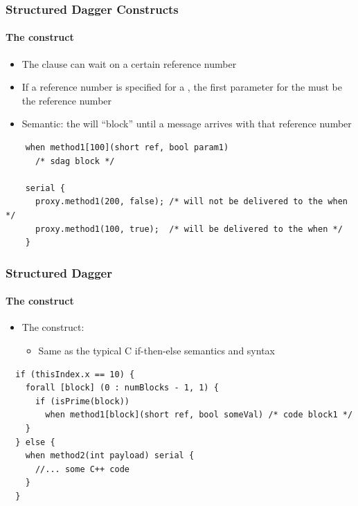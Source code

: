 
\begin{frame}[fragile]
  \frametitle{Structured Dagger Constructs}
  \framesubtitle{The  construct}
  \begin{itemize}
    \item The  clause can wait on a certain reference number
    \item If a reference number is specified for a , the first
      parameter for the  must be the reference number
    \item Semantic: the  will ``block'' until a message arrives with
      that reference number
  \end{itemize}
  \begin{lstlisting}
    when method1[100](short ref, bool param1)
      /* sdag block */

    serial {
      proxy.method1(200, false); /* will not be delivered to the when */
      proxy.method1(100, true);  /* will be delivered to the when */
    }
  \end{lstlisting}
\end{frame}

\begin{frame}[fragile]
  \frametitle{Structured Dagger}
  \framesubtitle{The  construct}
  \begin{itemize}
  \item The  construct:
    \begin{itemize}
    \item Same as the typical C if-then-else semantics and syntax
    \end{itemize}
  \end{itemize}
  \begin{lstlisting}
  if (thisIndex.x == 10) {
    forall [block] (0 : numBlocks - 1, 1) {
      if (isPrime(block))
        when method1[block](short ref, bool someVal) /* code block1 */
    }
  } else {
    when method2(int payload) serial {
      //... some C++ code
    }
  }
  \end{lstlisting}
\end{frame}

